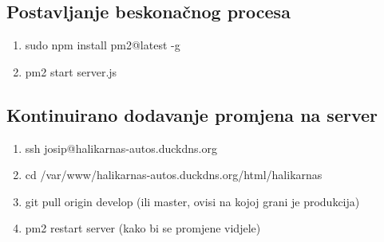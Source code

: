 \begin{flushleft}
	   \subsection{Postavljanje beskonačnog procesa}
	   \begin{enumerate}
	        \item sudo npm install pm2@latest -g
	        \item pm2 start server.js
	   \end{enumerate}
	   
	   \subsection{Kontinuirano dodavanje promjena na server}
	   \begin{enumerate}
	        \item ssh josip@halikarnas-autos.duckdns.org
	        \item cd /var/www/halikarnas-autos.duckdns.org/html/halikarnas
	        \item git pull origin develop (ili master, ovisi na kojoj grani je produkcija)
	        \item pm2 restart server (kako bi se promjene vidjele)
	   \end{enumerate}
	\end{flushleft}

